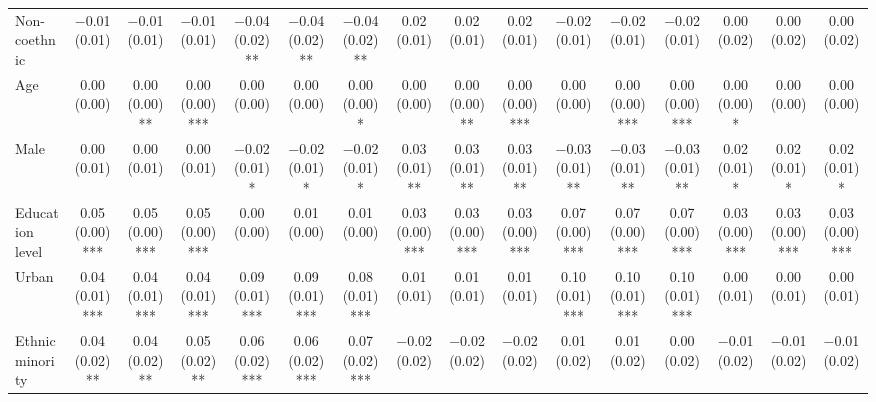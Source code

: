 \begin{table}[H]
\begin{tabular}[t]{lccccccccccccccc}
Non-coethnic & \num{-0.01} (\num{0.01}) & \num{-0.01} (\num{0.01}) & \num{-0.01} (\num{0.01}) & \num{-0.04} (\num{0.02})** & \num{-0.04} (\num{0.02})** & \num{-0.04} (\num{0.02})** & \num{0.02} (\num{0.01}) & \num{0.02} (\num{0.01}) & \num{0.02} (\num{0.01}) & \num{-0.02} (\num{0.01}) & \num{-0.02} (\num{0.01}) & \num{-0.02} (\num{0.01}) & \num{0.00} (\num{0.02}) & \num{0.00} (\num{0.02}) & \num{0.00} (\num{0.02})\\
Age & \num{0.00} (\num{0.00}) & \num{0.00} (\num{0.00})** & \num{0.00} (\num{0.00})*** & \num{0.00} (\num{0.00}) & \num{0.00} (\num{0.00}) & \num{0.00} (\num{0.00})* & \num{0.00} (\num{0.00}) & \num{0.00} (\num{0.00})** & \num{0.00} (\num{0.00})*** & \num{0.00} (\num{0.00}) & \num{0.00} (\num{0.00})*** & \num{0.00} (\num{0.00})*** & \num{0.00} (\num{0.00})* & \num{0.00} (\num{0.00}) & \num{0.00} (\num{0.00})\\
Male & \num{0.00} (\num{0.01}) & \num{0.00} (\num{0.01}) & \num{0.00} (\num{0.01}) & \num{-0.02} (\num{0.01})* & \num{-0.02} (\num{0.01})* & \num{-0.02} (\num{0.01})* & \num{0.03} (\num{0.01})** & \num{0.03} (\num{0.01})** & \num{0.03} (\num{0.01})** & \num{-0.03} (\num{0.01})** & \num{-0.03} (\num{0.01})** & \num{-0.03} (\num{0.01})** & \num{0.02} (\num{0.01})* & \num{0.02} (\num{0.01})* & \num{0.02} (\num{0.01})*\\
Education level & \num{0.05} (\num{0.00})*** & \num{0.05} (\num{0.00})*** & \num{0.05} (\num{0.00})*** & \num{0.00} (\num{0.00}) & \num{0.01} (\num{0.00}) & \num{0.01} (\num{0.00}) & \num{0.03} (\num{0.00})*** & \num{0.03} (\num{0.00})*** & \num{0.03} (\num{0.00})*** & \num{0.07} (\num{0.00})*** & \num{0.07} (\num{0.00})*** & \num{0.07} (\num{0.00})*** & \num{0.03} (\num{0.00})*** & \num{0.03} (\num{0.00})*** & \num{0.03} (\num{0.00})***\\
Urban & \num{0.04} (\num{0.01})*** & \num{0.04} (\num{0.01})*** & \num{0.04} (\num{0.01})*** & \num{0.09} (\num{0.01})*** & \num{0.09} (\num{0.01})*** & \num{0.08} (\num{0.01})*** & \num{0.01} (\num{0.01}) & \num{0.01} (\num{0.01}) & \num{0.01} (\num{0.01}) & \num{0.10} (\num{0.01})*** & \num{0.10} (\num{0.01})*** & \num{0.10} (\num{0.01})*** & \num{0.00} (\num{0.01}) & \num{0.00} (\num{0.01}) & \num{0.00} (\num{0.01})\\
Ethnic minority & \num{0.04} (\num{0.02})** & \num{0.04} (\num{0.02})** & \num{0.05} (\num{0.02})** & \num{0.06} (\num{0.02})*** & \num{0.06} (\num{0.02})*** & \num{0.07} (\num{0.02})*** & \num{-0.02} (\num{0.02}) & \num{-0.02} (\num{0.02}) & \num{-0.02} (\num{0.02}) & \num{0.01} (\num{0.02}) & \num{0.01} (\num{0.02}) & \num{0.00} (\num{0.02}) & \num{-0.01} (\num{0.02}) & \num{-0.01} (\num{0.02}) & \num{-0.01} (\num{0.02})\\

\end{tabular}
\end{table}
